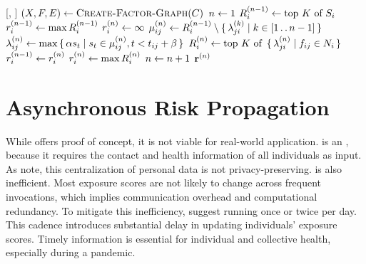 \begin{function}[H]{\nRiskPropagation}[\vScores, \vContacts]
  \State $(\vVariables, \vFactors, \vEdges) \assign \cCreateFactorGraph[\vContacts]$
  \State $n \leftarrow 1$
  \ForEach{$\vVariable[i] \in \vVariables$}
    \State $R_{i}^{(n - 1)} \leftarrow \text{top } K \text{ of } S_i$
    \State $r_{i}^{(n - 1)} \leftarrow \max R_{i}^{(n - 1)}$
    \State $r_{i}^{(n)} \leftarrow \infty$
  \EndFor
    \ForEach{$\{\vVariable[i], \vFactor[ij]\} \in \vEdges$}
      \State $\mu_{ij}^{(n)} \leftarrow R_{i}^{(n - 1)} \setminus \set{ \lambda_{ji}^{(k)} | k \in [1 \mathinner {\ldotp \ldotp}n - 1]}$
    \EndFor
    \ForEach{$\{\vVariable[i], \vFactor[ij]\} \in \vEdges$}
      \State $\lambda_{ij}^{(n)} \leftarrow \max \set{ \alpha s_t | s_t \in \mu_{ij}^{(n)}, t < t_{ij} + \beta}$
    \EndFor
    \ForEach{$\vVariable[i] \in \vVariables$}
      \State $\vRiskScores{i}{n} \assign \topK{\setBuilder{\vFactorMessage{j}{i}{n}}{\vFactor[ij] \in \vNeighbors_i}}$
    \EndFor
    \ForEach{$\vVariable[i] \in \vVariables$}
      \State $r_{i}^{(n - 1)} \leftarrow r_{i}^{(n)}$
      \State $r_{i}^{(n)} \leftarrow \max R_{i}^{(n)}$
    \EndFor
    \State $n \leftarrow n + 1$
  \EndWhile
  \State \Return $\mathbf{r}^{(n)}$
\end{function}

\section{Asynchronous Risk Propagation}\label{sec:asynchronous}

While \cRiskPropagation{} offers proof of concept, it is not viable for real-world application. \cRiskPropagation{} is an  \citep{Cormen2022}, because it requires the contact and health information of all individuals as input. As \citet{Ayday2021} note, this centralization of personal data is not privacy-preserving. \cRiskPropagation{} is also inefficient. Most exposure scores are not likely to change across frequent invocations, which implies communication overhead and computational redundancy. To mitigate this inefficiency, \citet{Ayday2020} suggest running \cRiskPropagation{} once or twice per day. This cadence introduces substantial delay in updating individuals' exposure scores. Timely information is essential for individual and collective health, especially during a pandemic.

